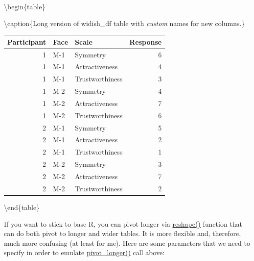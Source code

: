 \documentclass[
]{book}
\begin{document}
\textbackslash begin\{table\}

\textbackslash caption\{\label{tab:unnamed-chunk-210}Long version of widish\_df table with \emph{custom} names for new columns.\}
\centering

\begin{tabular}[t]{r|l|l|r}
\hline
Participant & Face & Scale & Response\\
\hline
1 & M-1 & Symmetry & 6\\
\hline
1 & M-1 & Attractiveness & 4\\
\hline
1 & M-1 & Trustworthiness & 3\\
\hline
1 & M-2 & Symmetry & 4\\
\hline
1 & M-2 & Attractiveness & 7\\
\hline
1 & M-2 & Trustworthiness & 6\\
\hline
2 & M-1 & Symmetry & 5\\
\hline
2 & M-1 & Attractiveness & 2\\
\hline
2 & M-1 & Trustworthiness & 1\\
\hline
2 & M-2 & Symmetry & 3\\
\hline
2 & M-2 & Attractiveness & 7\\
\hline
2 & M-2 & Trustworthiness & 2\\
\hline
\end{tabular}

\textbackslash end\{table\}

If you want to stick to base R, you can pivot longer via \href{https://stat.ethz.ch/R-manual/R-patched/library/stats/html/reshape.html}{reshape()} function that can do both pivot to longer and wider tables. It is more flexible and, therefore, much more confusing (at least for me). Here are some parameters that we need to specify in order to emulate \href{https://tidyr.tidyverse.org/reference/pivot_longer.html}{pivot\_longer()} call above:
\end{document}
